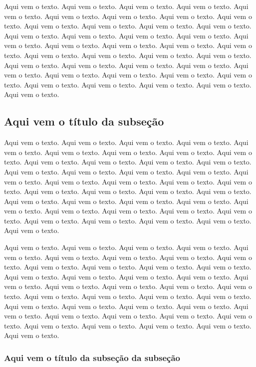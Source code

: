 \documentclass[12pt,a4paper]{article}
\begin{document}
	Aqui vem o texto. Aqui vem o texto. Aqui vem o texto. Aqui vem o texto. Aqui vem o texto. Aqui vem o texto. Aqui vem o texto. Aqui vem o texto. Aqui vem o texto. Aqui vem o texto. Aqui vem o texto. Aqui vem o texto. Aqui vem o texto. Aqui vem o texto. Aqui vem o texto. Aqui vem o texto. Aqui vem o texto. Aqui vem o texto. Aqui vem o texto. Aqui vem o texto. Aqui vem o texto. Aqui vem o texto. Aqui vem o texto. Aqui vem o texto. Aqui vem o texto. Aqui vem o texto. Aqui vem o texto. Aqui vem o texto. Aqui vem o texto. Aqui vem o texto. Aqui vem o texto. Aqui vem o texto. Aqui vem o texto. Aqui vem o texto. Aqui vem o texto. Aqui vem o texto. Aqui vem o texto. Aqui vem o texto. Aqui vem o texto. Aqui vem o texto.
	
	\subsection{Aqui vem o título da subseção}
	
	Aqui vem o texto. Aqui vem o texto. Aqui vem o texto. Aqui vem o texto. Aqui vem o texto. Aqui vem o texto. Aqui vem o texto. Aqui vem o texto. Aqui vem o texto. Aqui vem o texto. Aqui vem o texto. Aqui vem o texto. Aqui vem o texto. Aqui vem o texto. Aqui vem o texto. Aqui vem o texto. Aqui vem o texto. Aqui vem o texto. Aqui vem o texto. Aqui vem o texto. Aqui vem o texto. Aqui vem o texto. Aqui vem o texto. Aqui vem o texto. Aqui vem o texto. Aqui vem o texto. Aqui vem o texto. Aqui vem o texto. Aqui vem o texto. Aqui vem o texto. Aqui vem o texto. Aqui vem o texto. Aqui vem o texto. Aqui vem o texto. Aqui vem o texto. Aqui vem o texto. Aqui vem o texto. Aqui vem o texto. Aqui vem o texto. Aqui vem o texto.
	
	Aqui vem o texto. Aqui vem o texto. Aqui vem o texto. Aqui vem o texto. Aqui vem o texto. Aqui vem o texto. Aqui vem o texto. Aqui vem o texto. Aqui vem o texto. Aqui vem o texto. Aqui vem o texto. Aqui vem o texto. Aqui vem o texto. Aqui vem o texto. Aqui vem o texto. Aqui vem o texto. Aqui vem o texto. Aqui vem o texto. Aqui vem o texto. Aqui vem o texto. Aqui vem o texto. Aqui vem o texto. Aqui vem o texto. Aqui vem o texto. Aqui vem o texto. Aqui vem o texto. Aqui vem o texto. Aqui vem o texto. Aqui vem o texto. Aqui vem o texto. Aqui vem o texto. Aqui vem o texto. Aqui vem o texto. Aqui vem o texto. Aqui vem o texto. Aqui vem o texto. Aqui vem o texto. Aqui vem o texto. Aqui vem o texto. Aqui vem o texto.	
	
	\subsubsection{Aqui vem o título da subseção da subseção}
	
\end{document}
